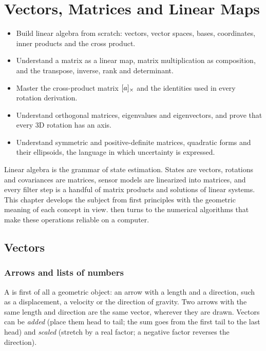 \chapter{Vectors, Matrices and Linear Maps}
\label{ch:linalg}

\begin{objectives}
\begin{itemize}
  \item Build linear algebra from scratch: vectors, vector spaces, bases, coordinates, inner products and the
        cross product.
  \item Understand a matrix as a linear map, matrix multiplication as composition, and the transpose, inverse,
        rank and determinant.
  \item Master the cross-product matrix $[a]_{\times}$ and the identities used in every rotation derivation.
  \item Understand orthogonal matrices, eigenvalues and eigenvectors, and prove that every 3D rotation has an axis.
  \item Understand symmetric and positive-definite matrices, quadratic forms and their ellipsoids, the language in
        which uncertainty is expressed.
\end{itemize}
\end{objectives}

Linear algebra is the grammar of state estimation. States are vectors, rotations and covariances are matrices,
sensor models are linearized into matrices, and every filter step is a handful of matrix products and solutions
of linear systems. This chapter develops the subject from first principles with the geometric meaning of each
concept in view.  then turns to the numerical algorithms that make these operations reliable
on a computer.

\section{Vectors}

\subsection{Arrows and lists of numbers}

A  is first of all a geometric object: an arrow with a length and a direction, such as a
displacement, a velocity or the direction of gravity. Two arrows with the same length and direction are the
same vector, wherever they are drawn. Vectors can be \emph{added} (place them head to tail; the sum goes from the
first tail to the last head) and \emph{scaled} (stretch by a real factor; a negative factor reverses the
direction).

